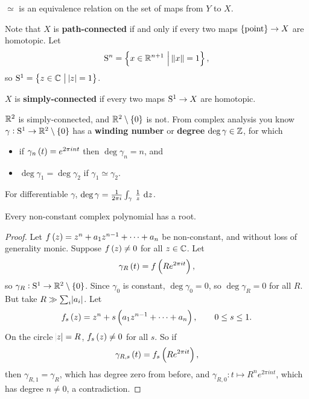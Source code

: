 \begin{exercise*}
$ \simeq $ is an equivalence relation on the set of maps from $ Y $ to $ X $.
\end{exercise*}

Note that $ X $ is \textbf{path-connected} if and only if every two maps $ \pt \to X $ are homotopic. Let
$$ \S^n = \cbr{x \in \RR^{n + 1} \st \norm{x} = 1}, $$
so $ \S^1 = \cbr{z \in \CC \st \abs{z} = 1} $.

\begin{definition*}
$ X $ is \textbf{simply-connected} if every two maps $ \S^1 \to X $ are homotopic.
\end{definition*}

\begin{example*}
$ \RR^2 $ is simply-connected, and $ \RR^2 \setminus \cbr{0} $ is not. From complex analysis you know $ \gamma : \S^1 \to \RR^2 \setminus \cbr{0} $ has a \textbf{winding number} or \textbf{degree} $ \deg \gamma \in \ZZ $, for which
\begin{itemize}
\item if $ \gamma_n\br{t} = e^{2\pi int} $ then $ \deg \gamma_n = n $, and
\item $ \deg \gamma_1 = \deg \gamma_2 $ if $ \gamma_1 \simeq \gamma_2 $.
\end{itemize}
For differentiable $ \gamma $, $ \deg \gamma = \tfrac{1}{2\pi i}\intd{\gamma}{}{\tfrac{1}{z}}{z} $.
\end{example*}

\begin{corollary}
Every non-constant complex polynomial has a root.
\end{corollary}

\begin{proof}
Let $ f\br{z} = z^n + a_1z^{n - 1} + \dots + a_n $ be non-constant, and without loss of generality monic. Suppose $ f\br{z} \ne 0 $ for all $ z \in \CC $. Let
$$ \gamma_R\br{t} = f\br{Re^{2\pi it}}, $$
so $ \gamma_R : \S^1 \to \RR^2 \setminus \cbr{0} $. Since $ \gamma_0 $ is constant, $ \deg \gamma_0 = 0 $, so $ \deg \gamma_R = 0 $ for all $ R $. But take $ R \gg \sum_i \abs{a_i} $. Let
$$ f_s\br{z} = z^n + s\br{a_1z^{n - 1} + \dots + a_n}, \qquad 0 \le s \le 1. $$
On the circle $ \abs{z} = R $, $ f_s\br{z} \ne 0 $ for all $ s $. So if
$$ \gamma_{R, s}\br{t} = f_s\br{Re^{2\pi it}}, $$
then $ \gamma_{R, 1} = \gamma_R $, which has degree zero from before, and $ \gamma_{R, 0} : t \mapsto R^ne^{2\pi int} $, which has degree $ n \ne 0 $, a contradiction.
\end{proof}

